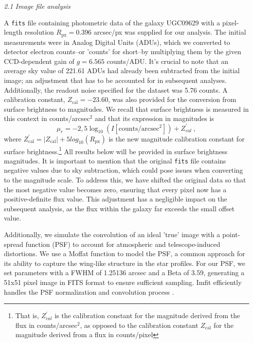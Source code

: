 
\vspace{0.1in}
{\noindent\large\textcolor{ullpurple}{\textit{2.1 Image file analysis}}}
\vspace{0.1in}

A \texttt{fits} file containing photometric data of the galaxy UGC09629 with a pixel-length resolution $R_{\text{px}} = 0.396$ arcsec/px was supplied for our analysis. The initial measurements were in Analog Digital Units (ADUs), which we converted to detector electron counts--or 'counts' for short--by multiplying them by the given CCD-dependent gain of $g=6.565$ counts/ADU. It's crucial to note that an average sky value of 221.61 ADUs had already been subtracted from the initial image; an adjustment that has to be accounted for in subsequent analyses. Additionally, the readout noise specified for the dataset was 5.76 counts. A calibration constant, $Z_\text{cal}=-23.60$, was also provided for the conversion from surface brightness to magnitudes. We recall that surface brightness is measured in this context in counts/arcsec$^2$ and that its expression in magnitudes is 
\begin{equation}
    \mu_{r}=-2,5\log_{10}(I[\text{counts}/\text{arcsec}^2]) +Z_{cal}^\prime \ ,
\end{equation}
where $Z_{\text{cal}}^\prime = \lvert Z_\text{cal} \rvert + 5log_{10}(R_{\text{px}})$ is the new magnitude calibration constant for surface brightness.\footnote{That is, $Z_{cal}^\prime$ is the calibration constant for the magnitude derived from the flux in counts/arcsec$^2$, as opposed to the calibration constant $Z_\text{cal}$ for the magnitude derived from a flux in counts/pixel} All results below will be provided in surface brightness magnitudes. It is important to mention that the original \texttt{fits} file contains negative values due to sky subtraction, which could pose issues when converting to the magnitude scale. To address this, we have shifted the original data so that the most negative value becomes zero, ensuring that every pixel now has a positive-definite flux value. This adjustment has a negligible impact on the subsequent analysis, as the flux within the galaxy far exceeds the small offset value.

Additionally, we simulate the convolution of an ideal 'true' image with a point-spread function (PSF) to account for atmospheric and telescope-induced distortions. We use a Moffat function to model the PSF, a common approach for its ability to capture the wing-like structure in the star profiles. For our PSF, we set parameters with a FWHM of 1.25136 arcsec and a Beta of 3.59, generating a 51x51 pixel image in FITS format to ensure sufficient sampling. Imfit efficiently handles the PSF normalization and convolution process \citep{erwin2015imfit}.

